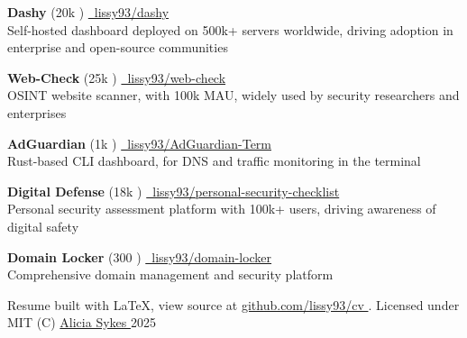\documentclass[]{resume-format}
\begin{document}
\vspace{0.5mm}
\begin{cvachievements}
  \setlength{\itemsep}{0mm}
  \item {\hspace{-5pt}
    \textbf{ Dashy } (20k \raisebox{0.5pt}{\scriptsize\faStar}) \href{ https://dashy.to }{\scriptsize\color{lightgray}\faLink} \hfill \href{https://github.com/lissy93/dashy}{\hspace{1pt}\faGithub\ lissy93/dashy}\\
    Self-hosted dashboard deployed on 500k+ servers worldwide, driving adoption in enterprise and open-source communities
  }
  \item {\hspace{-5pt}
    \textbf{ Web-Check } (25k \raisebox{0.5pt}{\scriptsize\faStar}) \href{ https://web-check.xyz }{\scriptsize\color{lightgray}\faLink} \hfill \href{https://github.com/lissy93/web-check}{\hspace{1pt}\faGithub\ lissy93/web-check}\\
    OSINT website scanner, with 100k MAU, widely used by security researchers and enterprises
  }
  \item {\hspace{-5pt}
    \textbf{ AdGuardian } (1k \raisebox{0.5pt}{\scriptsize\faStar}) \href{ https://adguardian.as93.net/ }{\scriptsize\color{lightgray}\faLink} \hfill \href{https://github.com/lissy93/AdGuardian-Term}{\hspace{1pt}\faGithub\ lissy93/AdGuardian-Term}\\
    Rust-based CLI dashboard, for DNS and traffic monitoring in the terminal
  }
  \item {\hspace{-5pt}
    \textbf{ Digital Defense } (18k \raisebox{0.5pt}{\scriptsize\faStar}) \href{ https://digital-defense.io/ }{\scriptsize\color{lightgray}\faLink} \hfill \href{https://github.com/lissy93/personal-security-checklist}{\hspace{1pt}\faGithub\ lissy93/personal-security-checklist}\\
    Personal security assessment platform with 100k+ users, driving awareness of digital safety
  }
  \item {\hspace{-5pt}
    \textbf{ Domain Locker } (300 \raisebox{0.5pt}{\scriptsize\faStar}) \href{ https://domain-locker.com/ }{\scriptsize\color{lightgray}\faLink} \hfill \href{https://github.com/lissy93/domain-locker}{\hspace{1pt}\faGithub\ lissy93/domain-locker}\\
    Comprehensive domain management and security platform
  }
\end{cvachievements}



\vspace{5mm}
\begin{center}
    \tiny\color{lightgray}
    Resume built with LaTeX, view source at
    \href{https://github.com/lissy93/cv}{ github.com/lissy93/cv }.
    Licensed under MIT (C)
    \href{https://aliciasykes.com}{ Alicia Sykes } 2025
\end{center}
\ 
\end{document}
